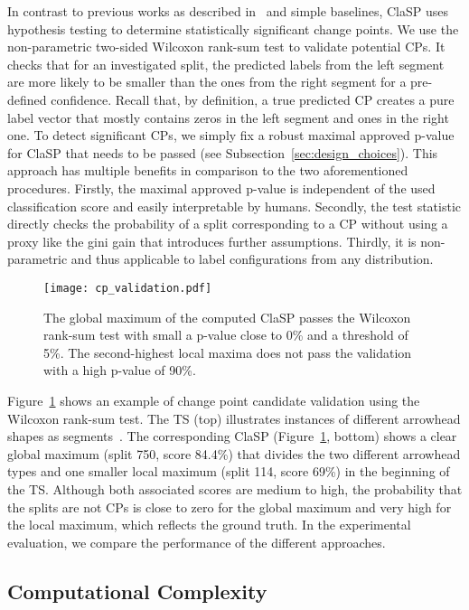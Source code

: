 \documentclass[pdflatex,sn-basic]{sn-jnl}
\begin{document}
In contrast to previous works as described in~\citep{aminikhanghahi2017survey,truong2020selective} and simple baselines, ClaSP uses hypothesis testing to determine statistically significant change points. We use the non-parametric two-sided Wilcoxon rank-sum test to validate potential CPs. It checks that for an investigated split, the predicted labels from the left segment are more likely to be smaller than the ones from the right segment for a pre-defined confidence. Recall that, by definition, a true predicted CP creates a pure label vector that mostly contains zeros in the left segment and ones in the right one. To detect significant CPs, we simply fix a robust maximal approved p-value for ClaSP that needs to be passed (see Subsection~\ref{sec:design_choices}). This approach has multiple benefits in comparison to the two aforementioned procedures. Firstly, the maximal approved p-value is independent of the used classification score and easily interpretable by humans. Secondly, the test statistic directly checks the probability of a split corresponding to a CP without using a proxy like the gini gain that introduces further assumptions. Thirdly, it is non-parametric and thus applicable to label configurations from any distribution. 

\begin{figure}[t]
	\texttt{[image: cp\_validation.pdf]}
	\caption{The global maximum of the computed ClaSP passes the Wilcoxon rank-sum test with small a p-value close to 0\% and a threshold of 5\%. The second-highest local maxima does not pass the validation with a high p-value of 90\%. \label{fig:ClaSP_cp_validation}
	}
\end{figure}

Figure~\ref{fig:ClaSP_cp_validation} shows an example of change point candidate validation using the Wilcoxon rank-sum test. The TS (top) illustrates instances of different arrowhead shapes as segments~\citep{UCRClassification}. The corresponding ClaSP (Figure~\ref{fig:ClaSP_cp_validation}, bottom) shows a clear global maximum (split 750, score 84.4\%) that divides the two different arrowhead types and one smaller local maximum (split 114, score 69\%) in the beginning of the TS. Although both associated scores are medium to high, the probability that the splits are not CPs is close to zero for the global maximum and very high for the local maximum, which reflects the ground truth. In the experimental evaluation, we compare the performance of the different approaches.


\subsection{Computational Complexity}\label{sec:complexity}
\end{document}
